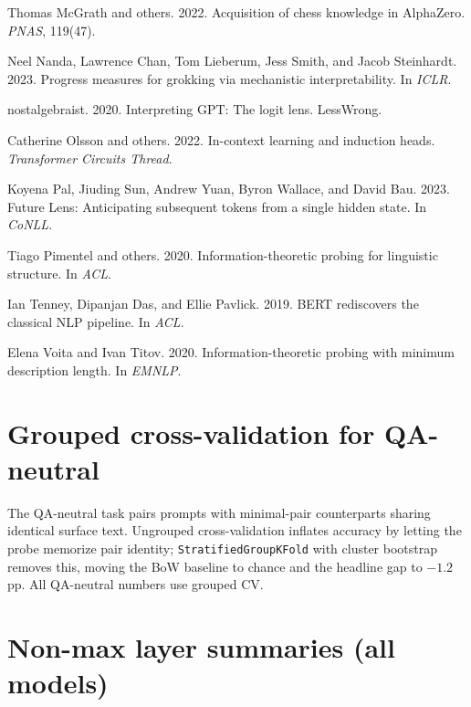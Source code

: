 \documentclass[11pt]{article}
\begin{document}
\begin{thebibliography}{}
Thomas McGrath and others. 2022.
\newblock Acquisition of chess knowledge in AlphaZero.
\newblock \emph{PNAS}, 119(47).

Neel Nanda, Lawrence Chan, Tom Lieberum, Jess Smith, and Jacob Steinhardt. 2023.
\newblock Progress measures for grokking via mechanistic interpretability.
\newblock In \emph{ICLR}.

nostalgebraist. 2020.
\newblock Interpreting GPT: The logit lens.
\newblock LessWrong.

Catherine Olsson and others. 2022.
\newblock In-context learning and induction heads.
\newblock \emph{Transformer Circuits Thread}.

Koyena Pal, Jiuding Sun, Andrew Yuan, Byron Wallace, and David Bau. 2023.
\newblock Future Lens: Anticipating subsequent tokens from a single hidden state.
\newblock In \emph{CoNLL}.

Tiago Pimentel and others. 2020.
\newblock Information-theoretic probing for linguistic structure.
\newblock In \emph{ACL}.

Ian Tenney, Dipanjan Das, and Ellie Pavlick. 2019.
\newblock BERT rediscovers the classical NLP pipeline.
\newblock In \emph{ACL}.

Elena Voita and Ivan Titov. 2020.
\newblock Information-theoretic probing with minimum description length.
\newblock In \emph{EMNLP}.

\end{thebibliography}

\appendix

\section{Grouped cross-validation for QA-neutral}
\label{app:grouped}

The QA-neutral task pairs prompts with minimal-pair counterparts sharing
identical surface text. Ungrouped cross-validation inflates accuracy by letting
the probe memorize pair identity; \texttt{StratifiedGroupKFold} with cluster
bootstrap removes this, moving the BoW baseline to chance and the headline gap
to $-1.2$pp. All QA-neutral numbers use grouped CV.

\section{Non-max layer summaries (all models)}
\label{app:nonmax}
\end{document}
